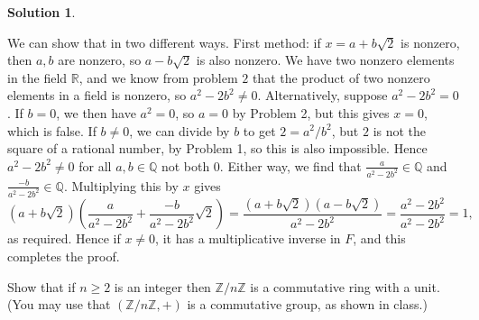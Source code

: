 \documentclass[12pt]{article}
\theoremstyle{definition}
\theoremstyle{definition}
\newtheorem*{soln}{Solution}
\newcommand{\Z}{\mathbb{Z}}
\newcommand{\Q}{\mathbb{Q}}
\newcommand{\R}{\mathbb{R}}
\begin{document}
\begin{soln}
\begin{enumerate}[label=(\alph*)]
We can show that in two different ways. First method: if $x=a+b\sqrt{2}$ is nonzero, then $a,b$ are nonzero, so $a-b\sqrt{2}$ is also nonzero. We have two nonzero elements in the field $\R$, and we know from problem $2$ that the product of two nonzero elements in a field is nonzero, so $a^2-2b^2\neq 0$. Alternatively, suppose $a^2-2b^2=0$. If $b=0$, we then have $a^2=0$, so $a=0$ by Problem 2, but this gives $x=0$, which is false. If $b\neq 0$, we can divide by $b$ to get $2=a^2/b^2$, but $2$ is not the square of a rational number, by Problem 1, so this is also impossible. Hence $a^2-2b^2\neq 0$ for all $a,b\in\Q$ not both $0$. Either way, we find that $\frac{a}{a^2-2b^2}\in \Q$ and $\frac{-b}{a^2-2b^2}\in\Q$. Multiplying this by $x$ gives
\[(a+b\sqrt{2})\left(\frac{a}{a^2-2b^2}+\frac{-b}{a^2-2b^2}\sqrt{2}\right)=\frac{(a+b\sqrt{2})(a-b\sqrt{2})}{a^2-2b^2}=\frac{a^2-2b^2}{a^2-2b^2}=1,\]
as required. Hence if $x\neq 0$, it has a multiplicative inverse in $F$, and this completes the proof.
\end{enumerate}
\end{soln}

\begin{prob}
Show that if $n\ge 2$ is an integer then $\Z/n\Z$ is a commutative ring with a unit.  (You may use that $(\Z/n\Z,+)$ is a commutative group, as shown in class.)
\end{prob}
\end{document}
